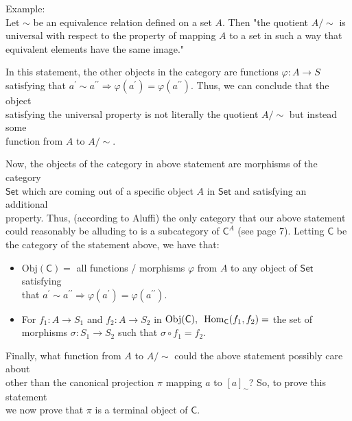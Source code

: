 \documentclass{book}
\newcommand{\exOne}{%
   \color{Purple}%
   \fontsize{14}{16}\selectfont%
}
\newcommand{\exTwo}{%
   \color{RedViolet}%
   \fontsize{13}{15}\selectfont%
}
\newenvironment{myIndent}{%
   \begin{adjustwidth}{2.5em}{0em}%
}{%
   \end{adjustwidth}%
}
\newcommand{\pprime}{{\prime\prime}}
\newcommand{\myHS}{ \hspace{0.5em}}
\newcommand{\myObj}{\mathrm{Obj}}
\newcommand{\myHom}{\mathrm{Hom}}
\newcommand{\mcateg}[1]{\mathsf{#1}}
\newcommand{\retTwo}{\hfill\bigbreak}
\begin{document}
\exOne
Example:\\
Let $\sim$ be an equivalence relation defined on a set $A$. Then "the quotient $A/{\sim}$ is\\ universal with respect to the property of mapping $A$ to a set in such a way that\\ equivalent elements have the same image."\retTwo
\begin{myIndent}\exTwo
   In this statement, the other objects in the category are functions $\varphi: A \longrightarrow S$\\ satisfying that $a^\prime \sim a^\pprime \Longrightarrow \varphi(a^\prime) = \varphi(a^\pprime)$. Thus, we can conclude that the object\\ satisfying the universal property is not literally the quotient $A/{\sim}$ but instead some\\ function from $A$ to $A/{\sim}$.\retTwo

   Now, the objects of the category in above statement are morphisms of the category\\ $\mcateg{Set}$ which are coming out of a specific object $A$ in $\mcateg{Set}$ and satisfying an additional\\ property. Thus, (according to Aluffi) the only category that our above statement\\ could reasonably be alluding to is a subcategory of $\mcateg{C}^A$ (see page 7). Letting $\mcateg{C}$ be\\ the category of the statement above, we have that:
   \begin{itemize}
      \item $\myObj(\mcateg{C}) = $ all functions / morphisms $\varphi$ from $A$ to any object of $\mcateg{Set}$ satisfying\\ that $a^\prime \sim a^\pprime \Longrightarrow \varphi(a^\prime) = \varphi(a^\pprime)$.
      
      \item For $f_1: A \rightarrow S_1$ and $f_2: A \rightarrow S_2$ in $\myObj(\mcateg{C}), \myHS \myHom_{\mcateg{C}}(f_1, f_2) = $ the set of\\ morphisms $\sigma: S_1 \rightarrow S_2$ such that $\sigma \circ f_1 = f_2$.\retTwo
   \end{itemize}

   Finally, what function from $A$ to $A / {\sim}$ could the above statement possibly care about\\ other than the canonical projection $\pi$ mapping $a$ to $[a]_\sim$? So, to prove this statement\\ we now prove that $\pi$ is a terminal object of $\mcateg{C}$.


\end{myIndent}
\end{document}
